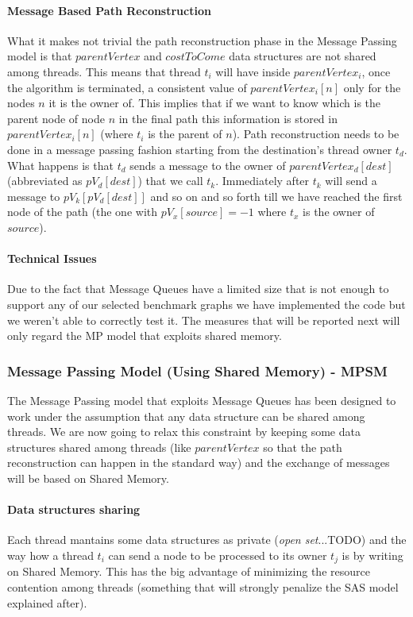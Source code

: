 \documentclass[twocolumn, switch]{article} %
\begin{document}
\paragraph{Message Based Path Reconstruction}
What it makes not trivial the path reconstruction phase in the Message Passing model
is that $parentVertex$ and $costToCome$ data structures are not shared among threads. 
This means that thread $t_i$ will have inside $parentVertex_i$, once the algorithm is terminated, 
a consistent value of $parentVertex_i[n]$ only for the nodes $n$ it is the owner of. This implies that if
we want to know which is the parent node of node $n$ in the final path this information
is stored in $parentVertex_i[n]$ (where $t_i$ is the parent of $n$). Path reconstruction needs to be done in a message passing fashion starting
from the destination's thread owner $t_d$. What happens is that $t_d$ sends a message to
the owner of $parentVertex_d[dest]$ (abbreviated as $pV_d[dest]$) that we call $t_k$. Immediately after $t_k$ will send a message
to $pV_k[pV_d[dest]]$ and so on and so forth till we have reached the first node of the path (the one with $pV_x[source] = -1$ where
$t_x$ is the owner of $source$).
\paragraph{Technical Issues}
Due to the fact that Message Queues have a limited size that is not enough to support any of our
selected benchmark graphs we have implemented the code but we weren't able to correctly test it. The
measures that will be reported next will only regard the MP model that exploits shared memory. 
\subsubsection{Message Passing Model (Using Shared Memory) - MPSM}
The Message Passing model that exploits Message Queues has been designed to work under the assumption 
that any data structure can be shared among threads. We are now going to relax this constraint by 
keeping some data structures shared among threads (like $parentVertex$ so that
the path reconstruction can happen in the standard way) and the exchange of messages will be based on Shared Memory.
\paragraph{Data structures sharing}
Each thread mantains some data structures as private (\textit{open set}...TODO) and the way how
a thread $t_i$ can send a node to be processed to its owner $t_j$ is by writing on Shared Memory. This
has the big advantage of minimizing the resource contention among threads (something that will strongly penalize the SAS model explained after).
\end{document}
